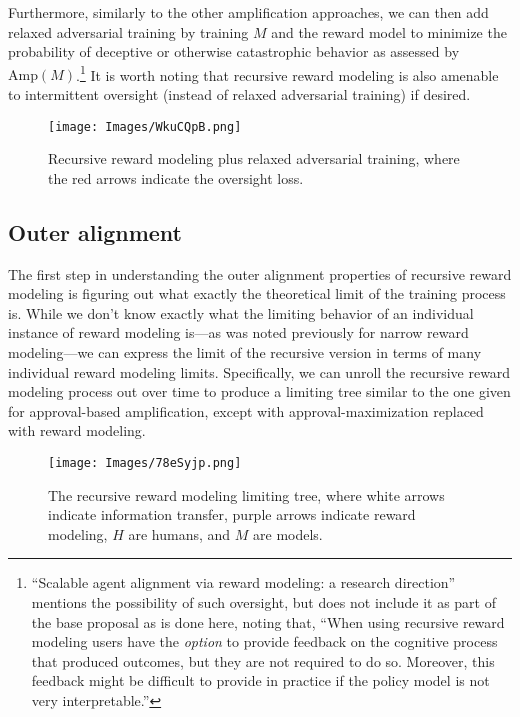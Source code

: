 \documentclass[
  onecolumn,
  natbib,
]{miri-tech-article}
\begin{document}
Furthermore, similarly to the other amplification approaches, we can then add relaxed adversarial training by training $M$ and the reward model to minimize the probability of deceptive or otherwise catastrophic behavior as assessed by $\text{Amp}(M)$.\footnote{``Scalable agent alignment via reward modeling: a research direction''\cite{leike} mentions the possibility of such oversight, but does not include it as part of the base proposal as is done here, noting that, ``When using recursive reward modeling users have the \textit{option} to provide feedback on the cognitive process that produced outcomes, but they are not required to do so. Moreover, this feedback might be difficult to provide in practice if the policy model is not very interpretable.''} It is worth noting that recursive reward modeling is also amenable to intermittent oversight (instead of relaxed adversarial training) if desired.

\vspace{4mm}

\begin{figure}[H]
  \centering
  \texttt{[image: Images/WkuCQpB.png]}
  \caption{Recursive reward modeling plus relaxed adversarial training, where the red arrows indicate the oversight loss.}
\end{figure}

\vspace{2mm}

\subsection{Outer alignment} The first step in understanding the outer alignment properties of recursive reward modeling is figuring out what exactly the theoretical limit of the training process is. While we don't know exactly what the limiting behavior of an individual instance of reward modeling is---as was noted previously for narrow reward modeling---we can express the limit of the recursive version in terms of many individual reward modeling limits. Specifically, we can unroll the recursive reward modeling process out over time to produce a limiting tree similar to the one given for approval-based amplification, except with approval-maximization replaced with reward modeling.

\begin{figure}[H]
  \centering
  \texttt{[image: Images/78eSyjp.png]}
  \caption{The recursive reward modeling limiting tree, where white arrows indicate information transfer, purple arrows indicate reward modeling, $H$ are humans, and $M$ are models.}
\end{figure}
\end{document}
